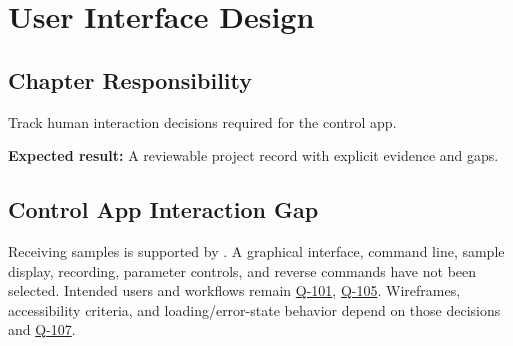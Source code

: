 \chapter{User Interface Design}
\section{Chapter Responsibility}
\label{Section:UserInterfaceDesignResponsibility}
Track human interaction decisions required for the control app.

\noindent\textbf{Expected result:} A reviewable project record with explicit evidence and gaps.


\section{Control App Interaction Gap}
Receiving samples is supported by . A graphical interface, command line, sample display, recording, parameter controls, and reverse commands have not been selected. Intended users and workflows remain \hyperref[Question:Q-101]{Q-101}, \hyperref[Question:Q-105]{Q-105}. Wireframes, accessibility criteria, and loading/error-state behavior depend on those decisions and \hyperref[Question:Q-107]{Q-107}.
